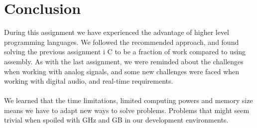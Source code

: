 \section{Conclusion}
During this assignment we have experienced the advantage of higher level programming languages.
We followed the recommended approach, and found solving the previous assignment i C to be a fraction
of work compared to using assembly. As with the last assignment, we were reminded about the challenges
when working with analog signals, and some new challenges were faced when working with digital audio,
and real-time requirements.\\
\\
We learned that the time limitations, limited computing powers and memory size means we have to adapt new ways to
solve problems. Problems that might seem trivial when spoiled with GHz and GB in our development environments.
